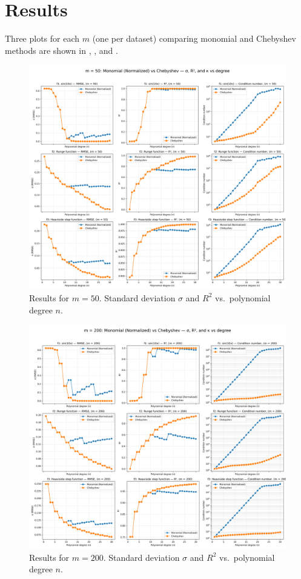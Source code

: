 \documentclass[a4paper,12pt]{article}
\begin{document}
\section*{Results}
Three plots for each \(m\) (one per dataset) comparing monomial and Chebyshev methods are shown in , , and .

\begin{figure}[b!]
    \centering
    \includegraphics[width=\textwidth]{fig/results_m50.png}
    \caption{Results for $m=50$. Standard deviation $\sigma$ and $R^2$ vs.\ polynomial degree $n$.}
    \label{fig:50}
\end{figure}


\begin{figure}[h!]
    \centering
    \includegraphics[width=\textwidth]{fig/results_m200.png}
    \caption{Results for $m=200$. Standard deviation $\sigma$ and $R^2$ vs.\ polynomial degree $n$.}
    \label{fig:200}
\end{figure}
\end{document}
